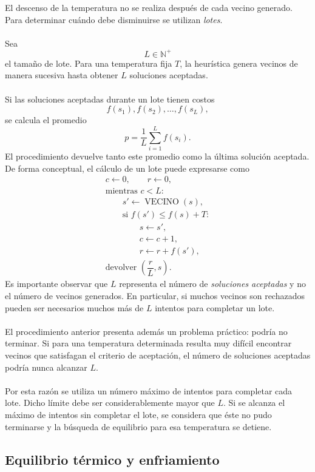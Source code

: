 \documentclass[12pt]{article}
\begin{document}
El descenso de la temperatura no se realiza después de cada vecino
generado. Para determinar cuándo debe disminuirse se utilizan
\emph{lotes}.
\\\\
Sea
\[
    L\in\mathbb{N}^{+}
\]
el tamaño de lote. Para una temperatura fija \(T\), la heurística genera
vecinos de manera sucesiva hasta obtener \(L\) soluciones aceptadas.
\\\\
Si las soluciones aceptadas durante un lote tienen costos
\[
    f(s_1),f(s_2),\ldots,f(s_L),
\]
se calcula el promedio
\[
    p=
    \frac{1}{L}
    \sum_{i=1}^{L}f(s_i).
\]
El procedimiento devuelve tanto este promedio como la última solución
aceptada. De forma conceptual, el cálculo de un lote puede expresarse como
\[
\begin{array}{l}
    c\leftarrow 0, \qquad r\leftarrow 0,\\[1mm]
    \text{mientras }c<L:\\
    \qquad s'\leftarrow \operatorname{VECINO}(s),\\
    \qquad \text{si }f(s')\leq f(s)+T:\\
    \qquad\qquad s\leftarrow s',\\
    \qquad\qquad c\leftarrow c+1,\\
    \qquad\qquad r\leftarrow r+f(s'),\\[1mm]
    \text{devolver }\left(\dfrac{r}{L},s\right).
\end{array}
\]
Es importante observar que \(L\) representa el número de
\emph{soluciones aceptadas} y no el número de vecinos generados. En
particular, si muchos vecinos son rechazados pueden ser necesarios muchos
más de \(L\) intentos para completar un lote.
\\\\
El procedimiento anterior presenta además un problema práctico: podría no
terminar. Si para una temperatura determinada resulta muy difícil encontrar
vecinos que satisfagan el criterio de aceptación, el número de soluciones
aceptadas podría nunca alcanzar \(L\).
\\\\
Por esta razón se utiliza un número máximo de intentos para completar cada
lote. Dicho límite debe ser considerablemente mayor que \(L\). Si se alcanza
el máximo de intentos sin completar el lote, se considera que éste no pudo
terminarse y la búsqueda de equilibrio para esa temperatura se detiene.

\subsection{Equilibrio térmico y enfriamiento}
\label{subsec:equilibrio}
\end{document}
